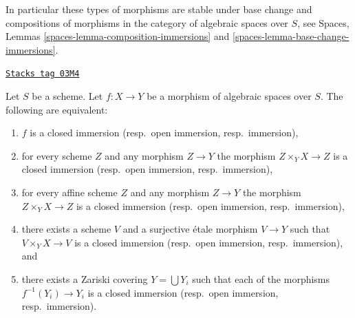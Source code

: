 \medskip\noindent
In particular these types of morphisms are stable under base change
and compositions of morphisms in the category of algebraic
spaces over $S$, see
Spaces, Lemmas \ref{spaces-lemma-composition-immersions} and
\ref{spaces-lemma-base-change-immersions}.

\begin{lemma}
\label{spaces-morphisms-lemma-closed-immersion-local}
\href{https://stacks.math.columbia.edu/tag/03M4}{\texttt{Stacks tag 03M4}}

Let $S$ be a scheme. Let $f : X \to Y$ be a morphism of algebraic spaces
over $S$. The following are equivalent:
\begin{enumerate}
\item $f$ is a closed immersion (resp.\ open immersion, resp.\ immersion),
\item for every scheme $Z$ and any morphism $Z \to Y$ the morphism
$Z \times_Y X \to Z$ is a closed immersion (resp.\ open immersion,
resp.\ immersion),
\item for every affine scheme $Z$ and any morphism
$Z \to Y$ the morphism $Z \times_Y X \to Z$ is a closed immersion
(resp.\ open immersion, resp.\ immersion),
\item there exists a scheme $V$ and a surjective \'etale morphism
$V \to Y$ such that $V \times_Y X \to V$ is a closed immersion
(resp.\ open immersion, resp.\ immersion), and
\item there exists a Zariski covering $Y = \bigcup Y_i$ such that
each of the morphisms $f^{-1}(Y_i) \to Y_i$ is a closed immersion
(resp.\ open immersion, resp.\ immersion).
\end{enumerate}
\end{lemma}

